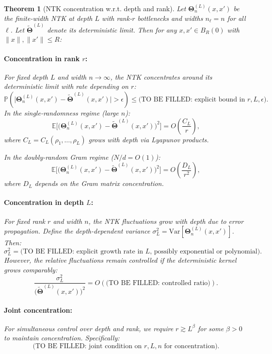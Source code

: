\documentclass{article}
\newcommand{\Kop}{\boldsymbol{\Theta}}
\newtheorem{theorem}{Theorem}
\begin{document}
\begin{theorem}[NTK concentration w.r.t. depth and rank]
\label{thm:ntk_concentration}
Let \( \Kop^{(L)}_n(x,x') \) be the finite-width NTK at depth \( L \) with rank-\( r \) bottlenecks and widths \( n_\ell = n \) for all \( \ell \). Let \( \tilde{\Kop}^{(L)} \) denote its deterministic limit. Then for any \( x, x' \in B_R(0) \) with \( \|x\|, \|x'\| \leq R \):

\paragraph{Concentration in rank \( r \):}
For fixed depth \( L \) and width \( n \to \infty \), the NTK concentrates around its deterministic limit with rate depending on \( r \):
\[
\mathbb{P}\!\left(\big|\Kop^{(L)}_n(x,x') - \tilde{\Kop}^{(L)}(x,x')\big| > \epsilon\right) \leq \text{(TO BE FILLED: explicit bound in } r, L, \epsilon\text{)}.
\]
In the single-randomness regime (large \( n \)):
\[
\mathbb{E}\big[\big(\Kop^{(L)}_n(x,x') - \tilde{\Kop}^{(L)}(x,x')\big)^2\big] = O\!\left(\frac{C_L}{r}\right),
\]
where \( C_L = C_L(\rho_1, \dots, \rho_L) \) grows with depth via Lyapunov products.

In the doubly-random Gram regime (\( N/d = O(1) \)):
\[
\mathbb{E}\big[\big(\Kop^{(L)}_n(x,x') - \tilde{\Kop}^{(L)}(x,x')\big)^2\big] = O\!\left(\frac{D_L}{r^2}\right),
\]
where \( D_L \) depends on the Gram matrix concentration.

\paragraph{Concentration in depth \( L \):}
For fixed rank \( r \) and width \( n \), the NTK fluctuations grow with depth due to error propagation. Define the depth-dependent variance \( \sigma_L^2 = \text{Var}[\Kop^{(L)}_n(x,x')] \). Then:
\[
\sigma_L^2 = \text{(TO BE FILLED: explicit growth rate in } L\text{, possibly exponential or polynomial)}.
\]
However, the \emph{relative} fluctuations remain controlled if the deterministic kernel grows comparably:
\[
\frac{\sigma_L^2}{\big(\tilde{\Kop}^{(L)}(x,x')\big)^2} = O\!\left(\text{(TO BE FILLED: controlled ratio)}\right).
\]

\paragraph{Joint concentration:}
For simultaneous control over depth and rank, we require \( r \gtrsim L^\beta \) for some \( \beta > 0 \) to maintain concentration. Specifically:
\[
\text{(TO BE FILLED: joint condition on } r, L, n \text{ for concentration)}.
\]
\end{theorem}
\end{document}
